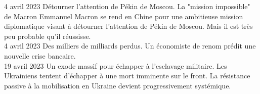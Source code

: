 \documentclass[a4paper]{article}
\begin{document}
4 avril 2023
Détourner l’attention de Pékin de Moscou. La "mission impossible" de Macron
Emmanuel Macron se rend en Chine pour une ambitieuse mission diplomatique visant à détourner l’attention de Pékin de Moscou. Mais il est très peu probable qu’il réussisse.
\\

4 avril 2023
Des milliers de milliards perdus.
Un économiste de renom prédit une nouvelle crise bancaire.
\\

19 avril 2023
Un exode massif pour échapper à l'esclavage militaire. Les Ukrainiens tentent d'échapper à une mort imminente sur le front.
La résistance passive à la mobilisation en Ukraine devient progressivement systémique.
\\
\end{document}
